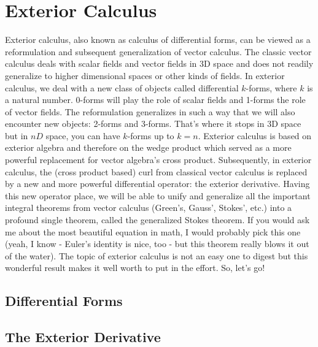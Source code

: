 \section{Exterior Calculus} 
Exterior calculus, also known as calculus of differential forms, can be viewed as a reformulation and subsequent generalization of vector calculus. The classic vector calculus deals with scalar fields and vector fields in 3D space and does not readily generalize to higher dimensional spaces or other kinds of fields. In exterior calculus, we deal with a new class of objects called differential $k$-forms, where $k$ is a natural number. 0-forms will play the role of scalar fields and 1-forms the role of vector fields. The reformulation generalizes in such a way that we will also encounter new objects: 2-forms and 3-forms. That's where it stops in 3D space but in $nD$ space, you can have $k$-forms up to $k=n$. Exterior calculus is based on exterior algebra and therefore on the wedge product which served as a more powerful replacement for vector algebra's cross product. Subsequently, in exterior calculus, the (cross product based) curl from classical vector calculus is replaced by a new and more powerful differential operator: the exterior derivative. Having this new operator place, we will be able to unify and generalize all the important integral theorems from vector calculus (Green's, Gauss', Stokes', etc.) into a profound single theorem, called the generalized Stokes theorem. If you would ask me about the most beautiful equation in math, I would probably pick this one (yeah, I know - Euler's identity is nice, too - but this theorem really blows it out of the water). The topic of exterior calculus is not an easy one to digest but this wonderful result makes it well worth to put in the effort. So, let's go!
 
\subsection{Differential Forms} 




\subsection{The Exterior Derivative}





